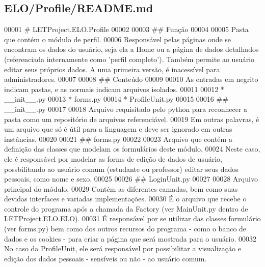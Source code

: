 \hypertarget{ELO_2Profile_2README_8md_source}{}\subsection{E\+L\+O/\+Profile/\+R\+E\+A\+D\+M\+E.md}

\begin{DoxyCode}
00001 # LETProject.ELO.Profile
00002 
00003 ## Função
00004 
00005 Pasta que contém o módulo de perfil.
00006 Responsável pelas páginas onde se encontram os dados do usuário, seja ela a Home ou a página de dados
       detalhados (referenciada internamente como 'perfil completo'). Também permite ao usuário editar seus
       próprios dados. A uma primeira versão, é inacessível para administradores.
00007 
00008 ## Conteúdo
00009 
00010 As entradas em negrito indicam pastas, e as normais indicam arquivos isolados.
00011 
00012 * \_\_init\_\_.py
00013 * forms.py
00014 * ProfileUnit.py
00015 
00016 ## \_\_init\_\_.py
00017 
00018 Arquivo requisitado pelo python para reconhecer a pasta como um repositório de arquivos referenciável.
00019 Em outras palavras, é um arquivo que só é útil para a linguagem e deve ser ignorado em outras
       instâncias.
00020 
00021 ## forms.py
00022 
00023 Arquivo que contém a definição das classes que modelam os formulários deste módulo.
00024 Neste caso, ele é responsável por modelar as forms de edição de dados de usuário, possbilitando ao
       usuário comum (estudante ou professor) editar seus dados pessoais, como nome e sexo.
00025 
00026 ## LoginUnit.py
00027 
00028 Arquivo principal do módulo.
00029 Contém as diferentes camadas, bem como suas devidas interfaces e variadas implementações.
00030 É o arquivo que recebe o controle do programa após a chamada da Factory (ver MainUnit.py dentro de
       LETProject.ELO.ELO). 
00031 É responsável por se utilizar das classes formulário (ver forms.py) bem como dos outros recursos do
       programa - como o banco de dados e os cookies - para criar a página que será mostrada para o usuário.
00032 No caso da ProfileUnit, ele será responsável por possibilitar a visualização e edição dos dados
       pessoais - sensíveis ou não - ao usuário comum.
\end{DoxyCode}
